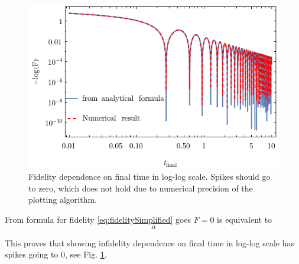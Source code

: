 \begin{figure}[H]
    \centering
    \includegraphics[scale=1.2]{../img/infidelityTfPlotLog.pdf}
    \caption{Fidelity dependence on final time in log-log scale. Spikes should go to zero, which does not hold due to numerical precision of the plotting algorithm.}
    \label{fig:infidelityTfPlotLog}
\end{figure}



From formula for fidelity \ref{eq:fidelitySimplified} goes $F=0$ is equivalent to
\begin{equation}
    a
\end{equation}

This proves that showing infidelity dependence on final time in log-log scale has spikes going to $0$, see Fig. \ref{fig:infidelityTfPlotLog}.




